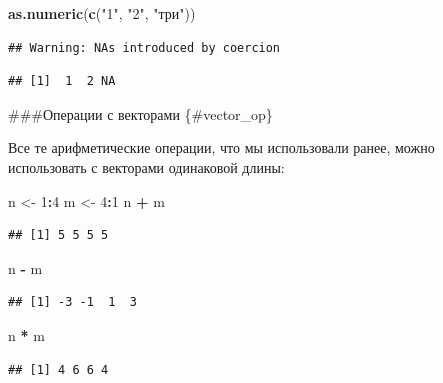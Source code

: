 \documentclass[]{book}
\newenvironment{Shaded}{\begin{snugshade}}{\end{snugshade}}
\newcommand{\DecValTok}[1]{\textcolor[rgb]{0.00,0.00,0.81}{#1}}
\newcommand{\KeywordTok}[1]{\textcolor[rgb]{0.13,0.29,0.53}{\textbf{#1}}}
\newcommand{\NormalTok}[1]{#1}
\newcommand{\OperatorTok}[1]{\textcolor[rgb]{0.81,0.36,0.00}{\textbf{#1}}}
\newcommand{\StringTok}[1]{\textcolor[rgb]{0.31,0.60,0.02}{#1}}
\begin{document}
\begin{Shaded}
\begin{Highlighting}[]
\KeywordTok{as.numeric}\NormalTok{(}\KeywordTok{c}\NormalTok{(}\StringTok{"1"}\NormalTok{, }\StringTok{"2"}\NormalTok{, }\StringTok{"три"}\NormalTok{))}
\end{Highlighting}
\end{Shaded}

\begin{verbatim}
## Warning: NAs introduced by coercion
\end{verbatim}

\begin{verbatim}
## [1]  1  2 NA
\end{verbatim}

\#\#\#Операции с векторами \{\#vector\_op\}

Все те арифметические операции, что мы использовали ранее, можно использовать с векторами одинаковой длины:

\begin{Shaded}
\begin{Highlighting}[]
\NormalTok{n <-}\StringTok{ }\DecValTok{1}\OperatorTok{:}\DecValTok{4}
\NormalTok{m <-}\StringTok{ }\DecValTok{4}\OperatorTok{:}\DecValTok{1}
\NormalTok{n }\OperatorTok{+}\StringTok{ }\NormalTok{m}
\end{Highlighting}
\end{Shaded}

\begin{verbatim}
## [1] 5 5 5 5
\end{verbatim}

\begin{Shaded}
\begin{Highlighting}[]
\NormalTok{n }\OperatorTok{-}\StringTok{ }\NormalTok{m}
\end{Highlighting}
\end{Shaded}

\begin{verbatim}
## [1] -3 -1  1  3
\end{verbatim}

\begin{Shaded}
\begin{Highlighting}[]
\NormalTok{n }\OperatorTok{*}\StringTok{ }\NormalTok{m}
\end{Highlighting}
\end{Shaded}

\begin{verbatim}
## [1] 4 6 6 4
\end{verbatim}
\end{document}
